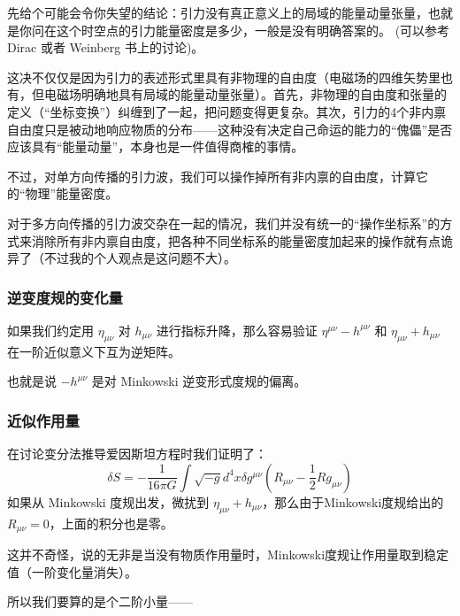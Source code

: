 \documentclass[CJK,13pt]{beamer}
\begin{document}
  \begin{frame}
    先给个可能会令你失望的结论：{\blue 引力没有真正意义上的局域的能量动量张量}，也就是你问在这个时空点的引力能量密度是多少，一般是没有明确答案的。
    (可以参考 Dirac 或者 Weinberg 书上的讨论)。

    \skipline

    {\scriptsize 这决不仅仅是因为引力的表述形式里具有非物理的自由度（电磁场的四维矢势里也有，但电磁场明确地具有局域的能量动量张量）。首先，非物理的自由度和张量的定义（“坐标变换”）纠缠到了一起，把问题变得更复杂。其次，引力的4个非内禀自由度只是被动地响应物质的分布——这种没有决定自己命运的能力的“傀儡”是否应该具有“能量动量”，本身也是一件值得商榷的事情。}
    
    \skipline

    不过，对{\blue 单方向传播的引力波，我们可以操作掉所有非内禀的自由度，计算它的“物理”能量密度}。

    \skipline
    
    {\scriptsize 对于多方向传播的引力波交杂在一起的情况，我们并没有统一的“操作坐标系”的方式来消除所有非内禀自由度，把各种不同坐标系的能量密度加起来的操作就有点诡异了（不过我的个人观点是这问题不大）。}
    
  \end{frame}
  
  \begin{frame}
    \frametitle{逆变度规的变化量}
    如果我们约定用 $\eta_{\mu\nu}$ 对 $h_{\mu\nu}$ 进行指标升降，那么容易验证
    $\eta^{\mu\nu}-h^{\mu\nu}$ 和 $\eta_{\mu\nu}+h_{\mu\nu}$ 在一阶近似意义下互为逆矩阵。

    \skiplines
    
    也就是说 $-h^{\mu\nu}$ 是对 Minkowski 逆变形式度规的偏离。
  \end{frame}

  \begin{frame}
    \frametitle{近似作用量}
    在讨论变分法推导爱因斯坦方程时我们证明了：
    $$ \delta S = -\frac{1}{16\pi G}\int \sqrt{-g} d^4x \delta g^{\mu\nu} \left(R_{\mu\nu}-\frac{1}{2}R g_{\mu\nu}\right) $$
    如果从 Minkowski 度规出发，微扰到 $\eta_{\mu\nu}+h_{\mu\nu}$，那么由于Minkowski度规给出的 $R_{\mu\nu}=0$，上面的积分也是零。

    \skipline

    这并不奇怪，说的无非是当没有物质作用量时，Minkowski度规让作用量取到稳定值（一阶变化量消失）。
    
    所以我们要算的是个二阶小量——
    \emini
    \emini
  \end{frame}
\end{document}
